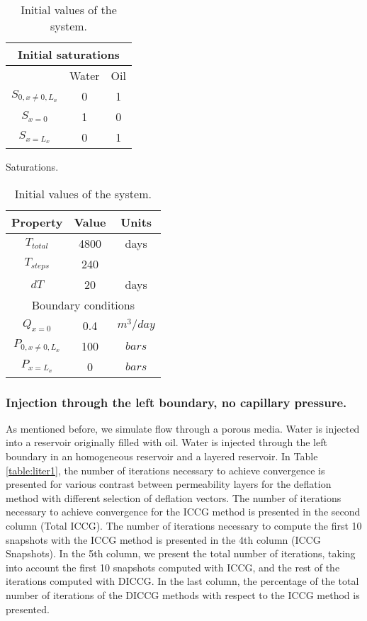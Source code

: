 \documentclass[12pt]{article}
\begin{document}
\begin{table}[!ht]
\begin{minipage}{.4\textwidth}
\centering
\begin{tabular}{ |c|c|c|} 
\hline
\multicolumn{3}{|c|}{Initial saturations}\\
\hline
&Water&Oil\\
\hline
$S_{0,x\neq 0, L_x}$&0&1\\
$S_{x=0}$&1&0\\
$S_{x=L_x}$&0&1\\
\hline
\end{tabular}
\caption{Saturations.}\label{table:sat}
\end{minipage}%
\hspace{1cm}
\begin{minipage}{.4\textwidth}
\centering
\begin{tabular}{ |c|c|c|} 
\hline
Property&Value&Units\\
\hline
    $T_{total}$&     4800& days\\
    $T_{steps}$& 240&\\
$dT$& 20&days\\
\hline
\multicolumn{3}{|c|}{Boundary conditions}\\
\hline
$Q_{x=0}$&0.4&$m^3/day$\\
$P_{0,x\neq 0, L_x}$&100&$bars$\\
$P_{x=L_x}$&0&$bars$\\
\hline
\end{tabular}\caption{Initial values of the system.}
\label{table:ic}
\end{minipage}
\end{table} 



\subsubsection*{Injection through the left boundary, no capillary pressure.}

As mentioned before, we simulate flow through a porous media. Water is injected into a reservoir originally filled with oil. Water is injected through the left boundary in an homogeneous reservoir and a layered reservoir. In Table \ref{table:liter1}, the number of iterations necessary to achieve convergence is presented for various contrast between permeability layers for the deflation method with different selection of deflation vectors. The number of iterations necessary to achieve convergence for the ICCG method is presented in the second column (Total ICCG). The number of iterations necessary to compute the first 10 snapshots with the ICCG method is presented in the 4th column (ICCG Snapshots). In the 5th column, we present the total number of iterations, taking into account the first 10 snapshots computed with ICCG, and the rest of the iterations computed with DICCG. In the last column, the percentage of the total number of iterations of the DICCG methods with respect to the ICCG method is presented. 
\end{document}
